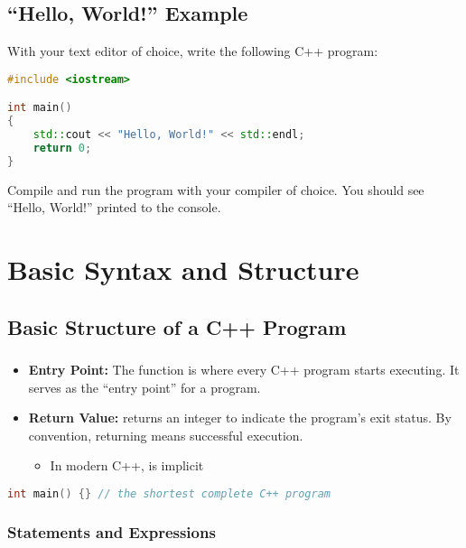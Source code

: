 \documentclass{article}
\begin{document}
\subsection{``Hello, World!'' Example}

\noindent
With your text editor of choice, write the following C++ program:

\begin{lstlisting}[language=C++]
#include <iostream>

int main()
{
	std::cout << "Hello, World!" << std::endl;
	return 0;
}
\end{lstlisting}

\noindent
Compile and run the program with your compiler of choice. You should see ``Hello, World!'' printed to the console.

\section{Basic Syntax and Structure}

\subsection{Basic Structure of a C++ Program}

\subsubsection{}

\begin{itemize}
	\item \textbf{Entry Point:} The  function is where every C++ program starts executing. It serves as the ``entry point'' for a program.
	\item \textbf{Return Value:}  returns an integer to indicate the program's exit status. By convention, returning  means successful execution.
	\begin{itemize}
		\item In modern C++,  is implicit
	\end{itemize}
\end{itemize}

\begin{lstlisting}[language=C++]
int main() {} // the shortest complete C++ program
\end{lstlisting}

\subsubsection{Statements and Expressions}
\end{document}
